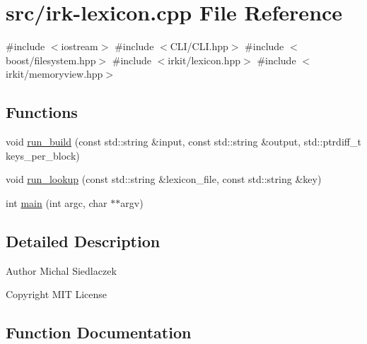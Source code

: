 \hypertarget{irk-lexicon_8cpp}{}\section{src/irk-\/lexicon.cpp File Reference}
\label{irk-lexicon_8cpp}
{\ttfamily \#include $<$iostream$>$}\newline
{\ttfamily \#include $<$C\+L\+I/\+C\+L\+I.\+hpp$>$}\newline
{\ttfamily \#include $<$boost/filesystem.\+hpp$>$}\newline
{\ttfamily \#include $<$irkit/lexicon.\+hpp$>$}\newline
{\ttfamily \#include $<$irkit/memoryview.\+hpp$>$}\newline
\subsection*{Functions}
\begin{DoxyCompactItemize}
\item 
void \mbox{\hyperlink{irk-lexicon_8cpp_af2415706bbd77d21f123a7ca0ba56b01}{run\+\_\+build}} (const std\+::string \&input, const std\+::string \&output, std\+::ptrdiff\+\_\+t keys\+\_\+per\+\_\+block)
\item 
void \mbox{\hyperlink{irk-lexicon_8cpp_ad74bcd0574f94df63c400143e14c67d4}{run\+\_\+lookup}} (const std\+::string \&lexicon\+\_\+file, const std\+::string \&key)
\item 
int \mbox{\hyperlink{irk-lexicon_8cpp_a3c04138a5bfe5d72780bb7e82a18e627}{main}} (int argc, char $\ast$$\ast$argv)
\end{DoxyCompactItemize}


\subsection{Detailed Description}
\begin{DoxyAuthor}{Author}
Michal Siedlaczek 
\end{DoxyAuthor}
\begin{DoxyCopyright}{Copyright}
M\+IT License 
\end{DoxyCopyright}


\subsection{Function Documentation}
\mbox{\label{irk-lexicon_8cpp_a3c04138a5bfe5d72780bb7e82a18e627}} 
